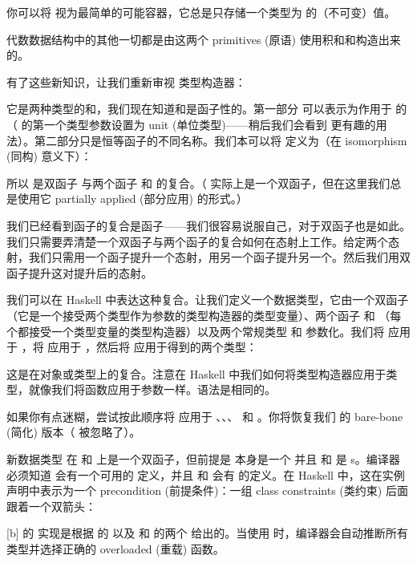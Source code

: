 
你可以将  视为最简单的可能容器，它总是只存储一个类型为  的（不可变）值。

代数数据结构中的其他一切都是由这两个 primitives (原语) 使用积和和构造出来的。

有了这些新知识，让我们重新审视  类型构造器：

它是两种类型的和，我们现在知道和是函子性的。第一部分  可以表示为作用于  的 （ 的第一个类型参数设置为 unit (单位类型)——稍后我们会看到  更有趣的用法）。第二部分只是恒等函子的不同名称。我们本可以将  定义为（在 isomorphism (同构) 意义下）：

所以  是双函子  与两个函子  和  的复合。（ 实际上是一个双函子，但在这里我们总是使用它 partially applied (部分应用) 的形式。）

我们已经看到函子的复合是函子——我们很容易说服自己，对于双函子也是如此。我们只需要弄清楚一个双函子与两个函子的复合如何在态射上工作。给定两个态射，我们只需用一个函子提升一个态射，用另一个函子提升另一个。然后我们用双函子提升这对提升后的态射。

我们可以在 Haskell 中表达这种复合。让我们定义一个数据类型，它由一个双函子 （它是一个接受两个类型作为参数的类型构造器的类型变量）、两个函子  和 （每个都接受一个类型变量的类型构造器）以及两个常规类型  和  参数化。我们将  应用于 ，将  应用于 ，然后将  应用于得到的两个类型：

这是在对象或类型上的复合。注意在 Haskell 中我们如何将类型构造器应用于类型，就像我们将函数应用于参数一样。语法是相同的。

如果你有点迷糊，尝试按此顺序将  应用于 、、、 和 。你将恢复我们  的 bare-bone (简化) 版本（ 被忽略了）。

新数据类型  在  和  上是一个双函子，但前提是  本身是一个  并且  和  是 s。编译器必须知道  会有一个可用的  定义，并且  和  会有  的定义。在 Haskell 中，这在实例声明中表示为一个 precondition (前提条件)：一组 class constraints (类约束) 后面跟着一个双箭头：

[b]
 的  实现是根据  的  以及  和  的两个  给出的。当使用  时，编译器会自动推断所有类型并选择正确的 overloaded (重载) 函数。

